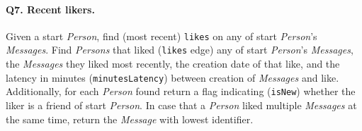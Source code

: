 \paragraph{\textbf{Q7}. Recent likers.}
Given a start \emph{Person}, find (most recent) \texttt{likes} on any of
start \emph{Person}'s \emph{Messages}. Find \emph{Persons} that liked
(\texttt{likes} edge) any of start \emph{Person}'s \emph{Messages}, the
\emph{Messages} they liked most recently, the creation date of that
like, and the latency in minutes (\texttt{minutesLatency}) between
creation of \emph{Messages} and like. Additionally, for each
\emph{Person} found return a flag indicating (\texttt{isNew}) whether
the liker is a friend of start \emph{Person}. In case that a
\emph{Person} liked multiple \emph{Messages} at the same time, return
the \emph{Message} with lowest identifier.
